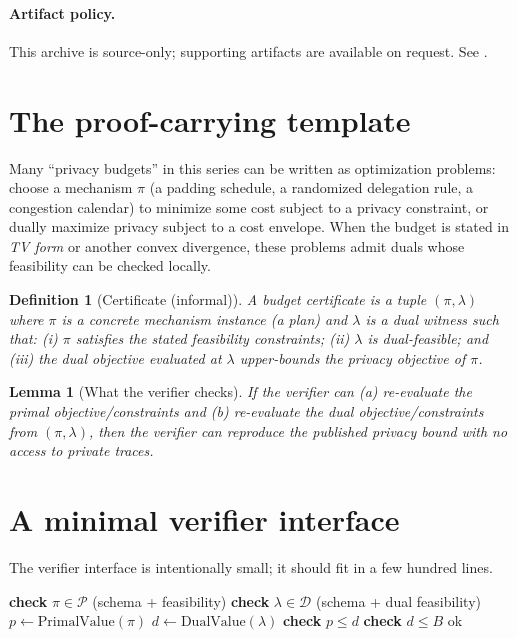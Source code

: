 \documentclass[11pt]{article}
\newtheorem{lemma}{Lemma}
\newtheorem{definition}{Definition}
\begin{document}
\paragraph{Artifact policy.}
This archive is source-only; supporting artifacts are available on request. See \cite{series:artifactpolicy}.

\section{The proof-carrying template}
Many ``privacy budgets'' in this series can be written as optimization problems:
choose a mechanism $\pi$ (a padding schedule, a randomized delegation rule, a congestion calendar) to minimize some cost subject to a privacy constraint, or dually maximize privacy subject to a cost envelope.
When the budget is stated in \emph{TV form} or another convex divergence, these problems admit duals whose feasibility can be checked locally.

\begin{definition}[Certificate (informal)]
A \emph{budget certificate} is a tuple $(\pi,\lambda)$ where $\pi$ is a concrete mechanism instance (a plan) and $\lambda$ is a dual witness such that:
(i) $\pi$ satisfies the stated feasibility constraints;
(ii) $\lambda$ is dual-feasible; and
(iii) the dual objective evaluated at $\lambda$ upper-bounds the privacy objective of $\pi$.
\end{definition}

\begin{lemma}[What the verifier checks]
If the verifier can (a) re-evaluate the primal objective/constraints and (b) re-evaluate the dual objective/constraints from $(\pi,\lambda)$, then the verifier can reproduce the published privacy bound with no access to private traces.
\end{lemma}

\section{A minimal verifier interface}
The verifier interface is intentionally small; it should fit in a few hundred lines.
\begin{algorithm}[h]
\caption{Toy verifier interface for a budget certificate}
\begin{algorithmic}[1]
  \State \textbf{check} $\pi\in\mathcal P$ (schema + feasibility)
  \State \textbf{check} $\lambda\in\mathcal D$ (schema + dual feasibility)
  \State $p\gets \mathrm{PrimalValue}(\pi)$
  \State $d\gets \mathrm{DualValue}(\lambda)$
  \State \textbf{check} $p\le d$ 
  \State \textbf{check} $d\le B$ 
  \State \Return \textsf{ok}
\EndProcedure
\end{algorithmic}
\end{algorithm}
\end{document}
